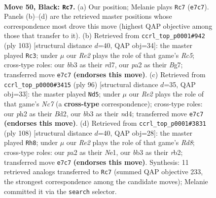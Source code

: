 \documentclass[11pt]{article}
\begin{document}
\clearpage

\begin{figure}[p]\centering
\begin{subfigure}{0.46\textwidth}\centering
\resizebox{\linewidth}{!}{%
\newchessgame
\chessboard[
  setfen={6k1/4rp1p/b5p1/4Pp2/5P2/1B5N/P4KPP/1n6 b - - 9 50},
  showmover=false,
  pgfstyle=straightmove, color=movearrow, markmove={e7-c7}
]}
\caption{}
\end{subfigure}\hfill
\begin{subfigure}{0.46\textwidth}\centering
\resizebox{\linewidth}{!}{%
\newchessgame
\chessboard[
  setfen={6k1/3R1pb1/6p1/1p5p/1PrpP2P/3N2P1/5P1K/8 b - - 12 52},
  showmover=false,
  pgfstyle=straightmove, color=movearrow, markmove={c4-c3}
]}
\caption{}
\end{subfigure}
\\[4pt]
\begin{subfigure}{0.46\textwidth}\centering
\resizebox{\linewidth}{!}{%
\newchessgame
\chessboard[
  setfen={3n4/2N2k1p/5pp1/1p2p3/1P1nP3/5P1P/3B1KP1/8 w - - 4 49},
  showmover=false,
  pgfstyle=straightmove, color=movearrow, markmove={c7-d5}
]}
\caption{}
\end{subfigure}\hfill
\begin{subfigure}{0.46\textwidth}\centering
\resizebox{\linewidth}{!}{%
\newchessgame
\chessboard[
  setfen={3R4/4pk1p/3n1p2/6pP/6P1/5P2/1r2PK2/4N3 w - - 12 55},
  showmover=false,
  pgfstyle=straightmove, color=movearrow, markmove={d8-h8}
]}
\caption{}
\end{subfigure}
\caption{\textbf{Move 50, Black: \texttt{Rc7}.} (a) Our position; Melanie plays \texttt{Rc7} (\texttt{e7c7}). Panels (b)--(d) are the retrieved master positions whose correspondence most drove this move (highest QAP objective among those that transfer to it). (b) Retrieved from \texttt{ccrl\_top\_p0001\#942} (ply 103) [structural distance $d$=40, QAP obj=34]: the master played \texttt{Rc3}; under $\mu$ our \emph{Re2} plays the role of that game's \emph{Rc5}; cross-type roles: our \emph{b}b3 as their \emph{r}d7, our \emph{p}a2 as their \emph{B}g7; transferred move \texttt{e7c7} \textbf{(endorses this move)}. (c) Retrieved from \texttt{ccrl\_top\_p0000\#3415} (ply 96) [structural distance $d$=35, QAP obj=33]: the master played \texttt{Nd5}; under $\mu$ our \emph{Re2} plays the role of that game's \emph{Nc7} (a \textbf{cross-type} correspondence); cross-type roles: our \emph{p}h2 as their \emph{B}d2, our \emph{b}b3 as their \emph{n}d4; transferred move \texttt{e7c7} \textbf{(endorses this move)}. (d) Retrieved from \texttt{ccrl\_top\_p0001\#3831} (ply 108) [structural distance $d$=40, QAP obj=28]: the master played \texttt{Rh8}; under $\mu$ our \emph{Re2} plays the role of that game's \emph{Rd8}; cross-type roles: our \emph{p}a2 as their \emph{N}e1, our \emph{b}b3 as their \emph{r}b2; transferred move \texttt{e7c7} \textbf{(endorses this move)}. Synthesis: 11 retrieved analogs transferred to \texttt{Rc7} (summed QAP objective 233, the strongest correspondence among the candidate moves); Melanie committed it via the \texttt{search} selector.}
\label{fig:thought-m99}
\end{figure}
\end{document}
